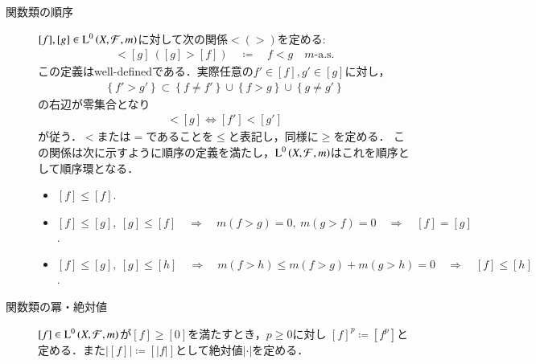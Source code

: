 \begin{description}
	\item[関数類の順序]
		$[f],[g] \in \operatorname{L}^{0} \left(X,\mathcal{F},m\right)$に対して次の関係$<(>)$を定める:
		\begin{align}
			[f] < [g]\ \left( [g] > [f] \right) \quad \coloneqq \quad f < g \quad \mbox{$m$-a.s.} \label{dfn:equiv_class_order}
		\end{align}
		この定義はwell-definedである．実際任意の$f' \in [f],g' \in [g]$に対し，
		\begin{align}
			\left\{ f' > g' \right\} \subset \left\{ f \neq f' \right\} \cup \left\{ f > g \right\} \cup \left\{ g \neq g' \right\}
		\end{align}
		の右辺が零集合となり
		\begin{align}
			[f] < [g] \Leftrightarrow [f'] < [g']
		\end{align}
		が従う．$<$または$=$であることを$\leq$と表記し，同様に$\geq$を定める．
		この関係は次に示すように順序の定義を満たし，$\operatorname{L}^{0} \left(X,\mathcal{F},m\right)$はこれを順序として順序環となる．
		\begin{itemize}
			\item $[f] \leq [f]$.
			\item $[f] \leq [g],\ [g] \leq [f] \quad \Rightarrow \quad m(f > g) =0,\ m(g > f) = 0 \quad \Rightarrow \quad [f]=[g]$.
			\item $[f] \leq [g],\ [g] \leq [h] \quad \Rightarrow \quad m(f > h) \leq m(f > g) + m(g > h) = 0 \quad \Rightarrow \quad [f]\leq[h]$.
		\end{itemize}
		
	\item[関数類の冪・絶対値]
		$[f] \in \operatorname{L}^{0} \left(X,\mathcal{F},m\right)$が$[f] \geq [0]$を満たすとき，$p \geq 0$に対し
		$[f]^p \coloneqq [f^p]$と定める．また$|[f]| \coloneqq [|f|]$として絶対値$|\cdot|$を定める．
\end{description}

